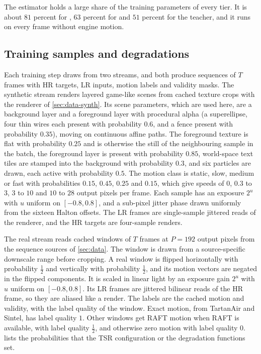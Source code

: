 The estimator holds a large share of the training parameters of every tier. It is about $81$ percent for , $63$ percent for  and $51$ percent for the teacher, and it runs on every frame without engine motion.

\subsection{Training samples and degradations}\label{sec:tsrm-data}

Each training step draws from two streams, and both produce sequences of $T$ frames with HR targets, LR inputs, motion labels and validity masks. The synthetic stream renders layered game-like scenes from cached texture crops with the renderer of \cref{sec:data-synth}. Its scene parameters, which are used here, are a background layer and a foreground layer with procedural alpha (a superellipse, four thin wires each present with probability $0.6$, and a fence present with probability $0.35$), moving on continuous affine paths. The foreground texture is flat with probability $0.25$ and is otherwise the still of the neighbouring sample in the batch, the foreground layer is present with probability $0.85$, world-space text tiles are stamped into the background with probability $0.3$, and six particles are drawn, each active with probability $0.5$. The motion class is static, slow, medium or fast with probabilities $0.15$, $0.45$, $0.25$ and $0.15$, which give speeds of $0$, $0.3$ to $3$, $3$ to $10$ and $10$ to $28$ output pixels per frame. Each sample has an exposure $2^{u}$ with $u$ uniform on $[-0.8,0.8]$, and a sub-pixel jitter phase drawn uniformly from the sixteen Halton offsets. The LR frames are single-sample jittered reads of the renderer, and the HR targets are four-sample renders.

The real stream reads cached windows of $T$ frames at $P=192$ output pixels from the sequence sources of \cref{sec:data}. The window is drawn from a source-specific downscale range before cropping. A real window is flipped horizontally with probability $\tfrac12$ and vertically with probability $\tfrac12$, and its motion vectors are negated in the flipped components. It is scaled in linear light by an exposure gain $2^{u}$ with $u$ uniform on $[-0.8,0.8]$. Its LR frames are jittered bilinear reads of the HR frame, so they are aliased like a render. The labels are the cached motion and validity, with the label quality of the window. Exact motion, from TartanAir and Sintel, has label quality $1$. Other windows get RAFT motion when RAFT is available, with label quality $\tfrac12$, and otherwise zero motion with label quality $0$.  lists the probabilities that the TSR configuration or the degradation functions set.

